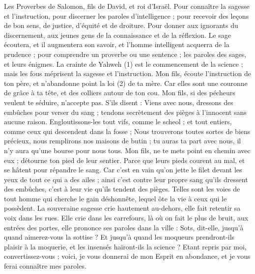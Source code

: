 \begin{multicols}{2}
\VerseOne{}Les Proverbes de Salomon, fils de David, et roi d'Israël.
Pour connaître la sagesse et l'instruction, pour discerner les paroles d'intelligence ;
pour recevoir des leçons de bon sens, de justice, d’équité et de droiture.
Pour donner aux ignorants du discernement, aux jeunes gens de la connaissance et de la réflexion.
Le sage écoutera, et il augmentera son savoir, et l'homme intelligent acquerra de la prudence ;
pour comprendre un proverbe ou une sentence ; les paroles des sages, et leurs énigmes.
La crainte de Yahweh (1) est le commencement de la science ; mais les fous méprisent la sagesse et l'instruction.
Mon fils, écoute l'instruction de ton père, et n'abandonne point la loi (2) de ta mère.
Car elles sont une couronne de grâce à ta tête, et des colliers autour de ton cou.
Mon fils, si des pécheurs veulent te séduire, n’accepte pas.
S'ils disent : Viens avec nous, dressons des embûches pour verser du sang ; tendons secrètement des pièges à l’innocent sans aucune raison.
Engloutissons-les tout vifs, comme le scheol ; et tout entiers, comme ceux qui descendent dans la fosse ;
Nous trouverons toutes sortes de biens précieux, nous remplirons nos maisons de butin ;
tu auras ta part avec nous, il n'y aura qu'une bourse pour nous tous.
Mon fils, ne te mets point en chemin avec eux ; détourne ton pied de leur sentier.
Parce que leurs pieds courent au mal, et se hâtent pour répandre le sang.
Car c’est en vain qu’on jette le filet devant les yeux de tout ce qui a des ailes ;
ainsi c’est contre leur propre sang qu’ils dressent des embûches, c’est à leur vie qu’ils tendent des pièges.
Telles sont les voies de tout homme qui cherche le gain déshonnête, lequel ôte la vie à ceux qui le possèdent.
La souveraine sagesse crie hautement au-dehors, elle fait retentir sa voix dans les rues.
Elle crie dans les carrefours, là où on fait le plus de bruit, aux entrées des portes, elle prononce ses paroles dans la ville :
Sots, dit-elle, jusqu'à quand aimerez-vous la sottise ? Et jusqu'à quand les moqueurs prendront-ils plaisir à la moquerie, et les insensés haïront-ils la science ?
Etant repris par moi, convertissez-vous ; voici, je vous donnerai de mon Esprit en abondance, et je vous ferai connaître mes paroles.

\end{multicols}
